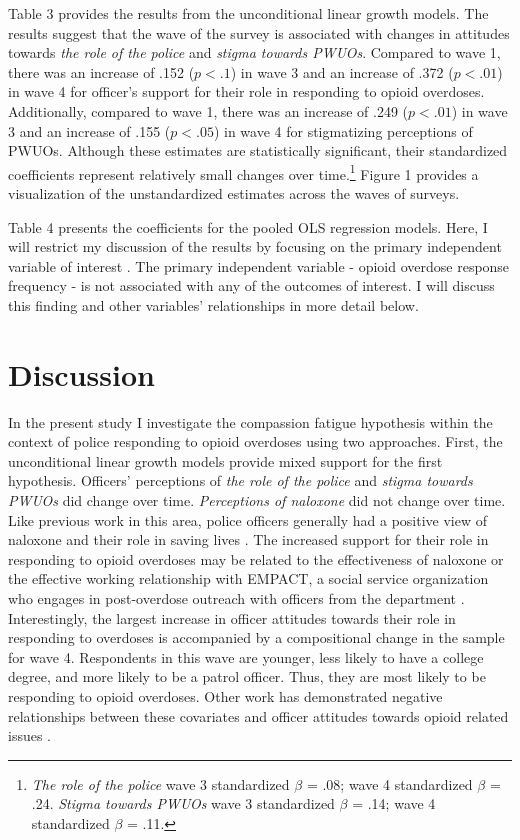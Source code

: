 Table 3 provides the results from the unconditional linear growth models. The results suggest that the wave of the survey is associated with changes in attitudes towards \textit{the role of the police} and \textit{stigma towards PWUOs}. Compared to wave 1, there was an increase of .152 (\(p < .1\)) in wave 3 and an increase of .372 (\(p < .01\)) in wave 4 for officer's support for their role in responding to opioid overdoses. Additionally, compared to wave 1, there was an increase of .249 (\(p < .01\)) in wave 3 and an increase of .155 (\(p < .05\)) in wave 4 for stigmatizing perceptions of PWUOs. Although these estimates are statistically significant, their standardized coefficients represent relatively small changes over time.\footnote{\textit{The role of the police} wave 3 standardized \(\beta\) = .08; wave 4 standardized \(\beta\) = .24. \textit{Stigma towards PWUOs} wave 3 standardized \(\beta\) = .14; wave 4 standardized \(\beta\) = .11.} Figure 1 provides a visualization of the unstandardized estimates across the waves of surveys. 

Table 4 presents the coefficients for the pooled OLS regression models. Here, I will restrict my discussion of the results by focusing on the primary independent variable of interest \parencite{keele_causal_2020}. The primary independent variable - opioid overdose response frequency - is not associated with any of the outcomes of interest. I will discuss this finding and other variables' relationships in more detail below. 

\section{Discussion}

In the present study I investigate the compassion fatigue hypothesis within the context of police responding to opioid overdoses using two approaches. First, the unconditional linear growth models provide mixed support for the first hypothesis. Officers' perceptions of \textit{the role of the police} and \textit{stigma towards PWUOs} did change over time. \textit{Perceptions of naloxone} did not change over time. Like previous work in this area, police officers generally had a positive view of naloxone and their role in saving lives \parencite{white_narcan_2021, pourtaher_naloxone_2022, reichert_police_2023}. The increased support for their role in responding to opioid overdoses may be related to the effectiveness of naloxone \parencite{white_leveraging_2022} or the effective working relationship with EMPACT, a social service organization who engages in post-overdose outreach with officers from the department \parencite{white_moving_2021}. Interestingly, the largest increase in officer attitudes towards their role in responding to overdoses is accompanied by a compositional change in the sample for wave 4. Respondents in this wave are younger, less likely to have a college degree, and more likely to be a patrol officer. Thus, they are most likely to be responding to opioid overdoses. Other work has demonstrated negative relationships between these covariates and officer attitudes towards opioid related issues \parencite{kruis_police_2020, reichert_police_2023}.

